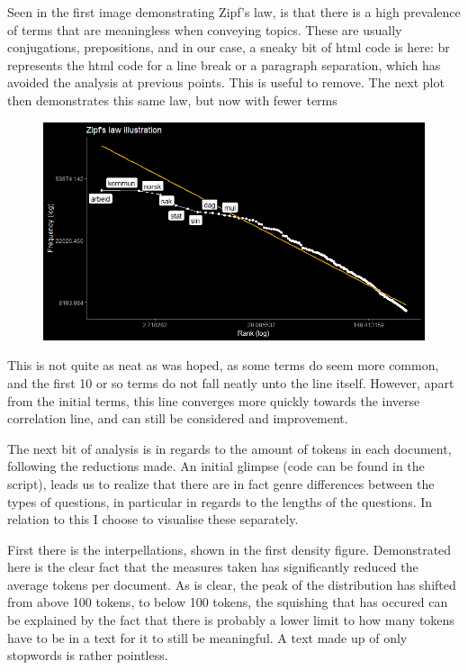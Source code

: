 \documentclass[12pt]{article}
\begin{document}
	Seen in the first image demonstrating Zipf's law, is that there is a high prevalence of terms that are meaningless when conveying topics. These are usually conjugations, prepositions, and in our case, a sneaky bit of html code is here: br represents the html code for a line break or a paragraph separation, which has avoided the analysis at previous points. This is useful to remove. The next plot then demonstrates this same law, but now with fewer terms
	
	\begin{figure}[h]
		\includegraphics[scale=0.60]{Img/ziplaw2.PNG}
	\end{figure}
	
	This is not quite as neat as was hoped, as some terms do seem more common, and the first 10 or so terms do not fall neatly unto the line itself. However, apart from the initial terms, this line converges more quickly towards the inverse correlation line, and can still be considered and improvement.
	
	The next bit of analysis is in regards to the amount of tokens in each document, following the reductions made. An initial glimpse (code can be found in the script), leads us to realize that there are in fact genre differences between the types of questions, in particular in regards to the lengths of the questions. In relation to this I choose to visualise these separately. 
	
	First there is the interpellations, shown in the first density figure. Demonstrated here is the clear fact that the measures taken has significantly reduced the average tokens per document. As is clear, the peak of the distribution has shifted from above 100 tokens, to below 100 tokens, the squishing that has occured can be explained by the fact that there is probably a lower limit to how many tokens have to be in a text for it to still be meaningful. A text made up of only stopwords is rather pointless.
	
\end{document}
